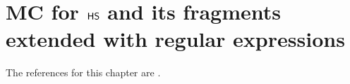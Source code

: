 \chapter[MC for $\HS$ and its fragments with regular expressions]{MC for $\HS$ and its fragments \\ extended with regular expressions}\label{chap:Gand17}
\begin{chapref}
The references for this chapter are \cite{sefm17,gandalf17,icRegex}.
\end{chapref}

\minitoc\mtcskip

\newcommand{\Trans}{\Edges}
\newcommand{\epist}{\text{epistemic}}
\renewcommand{\Instance}{\mathcal{I}}

\renewcommand{\Init}{\textit{Init}}

\newcommand{\GLab}{\textit{Lab}\,}

\newcommand{\M}{{\mathcal{M}}}
\newcommand{\WS}{{\mathcal{W}}}

\newcommand{\FMC}{\mathsf{FMC}}

\newcommand{\acc}{\textit{acc}}

\newcommand{\subfB}{\mathsf{Subf}_{\hsB}}
\newcommand{\conf}{\mathsf{Conf}}
\newcommand{\SD}{\textsf{SD}}


\newcommand{\Summary}{\ensuremath{\mathcal{S}}}
\newcommand{\PrefS}{{\mathit{PS}}}
\renewcommand{\End}{\textit{end}}
\newcommand{\NU}{\textit{not\_unique}}
\newcommand{\Double}{\textit{double}}
\newcommand{\Single}{\textit{single}}
\newcommand{\Row}{\textit{row}}
\newcommand{\Column}{\textit{col}}
\newcommand{\CInc}{\textit{c,inc}}
\newcommand{\RInc}{\textit{r,inc}}
\newcommand{\Complete}{\textit{comp}}
\newcommand{\MC}{\textit{mc}}
\newcommand{\IC}{\textit{ic}}
\newcommand{\MT}{\textit{MT}}
\newcommand{\IMT}{\textit{IMT}}
\newcommand{\Coh}{\textit{coh}}
\newcommand{\Pos}{\textit{P}}
\newcommand{\Alt}{\Upsilon_w}
\newcommand{\AltN}{\Upsilon}

















% 
